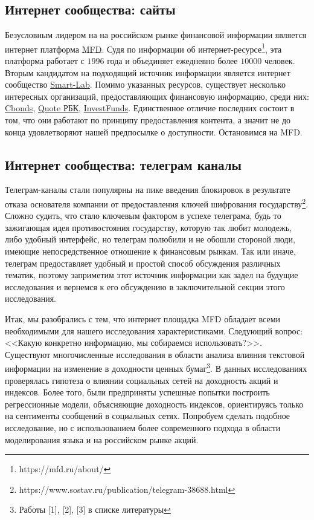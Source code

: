 \documentclass{article}
\begin{document}
\subsection{Интернет сообщества: сайты}

Безусловным лидером на на российском рынке финансовой информации является интернет платформа \href{www.mfd.ru}{MFD}. Судя по информации об интернет-ресурсе\footnote{https://mfd.ru/about/}, эта платформа работает с $1996$ года и объединяет ежедневно более $10000$ человек.
Вторым кандидатом на подходящий источник информации является интернет сообщество \href{https://smart-lab.ru}{Smart-Lab}. Помимо указанных ресурсов, существует несколько интересных организаций, предоставляющих финансовую информацию, среди них: \href{http://cbonds.ru}{Cbonds}, \href{https://quote.rbc.ru}{Quote РБК}, \href{https://investfunds.ru}{InvestFunds}. 
Единственное отличие последних состоит в том, что они работают по принципу предоставления контента, а значит не до конца удовлетворяют нашей предпосылке о доступности. Остановимся на MFD.

\subsection{Интернет сообщества: телеграм каналы}
Телеграм-каналы стали популярны на пике введения блокировок в результате отказа основателя компании от предоставления ключей шифрования государству\footnote{https://www.sostav.ru/publication/telegram-38688.html}. Сложно судить, что стало ключевым фактором в успехе телеграма, будь то зажигающая идея противостояния государству, которую так любит молодежь, либо удобный интерфейс, но телеграм полюбили и не обошли стороной люди, имеющие непосредственное отношение к финансовым рынкам. Так или иначе, телеграм предоставляет удобный и простой способ обсуждения различных тематик, поэтому заприметим этот источник информации как задел на будущие исследования и вернемся к его обсуждению в заключительной секции этого исследования. 
\par Итак, мы разобрались с тем, что интернет площадка MFD обладает всеми необходимыми для нашего исследования характеристиками. Следующий вопрос: <<Какую конкретно информацию, мы собираемся использовать?>>. Существуют многочисленные исследования в области анализа влияния текстовой информации на изменение в доходности ценных бумаг\footnote{Работы [1], [2], [3] в списке литературы}. В данных исследованиях проверялась гипотеза о влиянии социальных сетей на доходность акций и индексов. Более того, были предприняты успешные попытки построить регрессионные модели, объясняющие доходность индексов, ориентируясь только на сентименты сообщений в социальных сетях. Попробуем сделать подобное исследование, но с использованием более современного подхода в области моделирования языка и на российском рынке акций.
\end{document}
